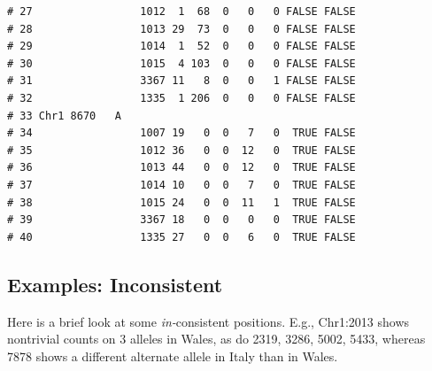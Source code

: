 \documentclass{article}\usepackage[]{graphicx}\usepackage[]{color}
\makeatletter
\newenvironment{kframe}{%
 \def\at@end@of@kframe{}%
 \ifinner\ifhmode%
  \def\at@end@of@kframe{\end{minipage}}%
  \begin{minipage}{\columnwidth}%
 \fi\fi%
 \def\FrameCommand##1{\hskip\@totalleftmargin \hskip-\fboxsep
 \colorbox{shadecolor}{##1}\hskip-\fboxsep
     \hskip-\linewidth \hskip-\@totalleftmargin \hskip\columnwidth}%
 \MakeFramed {\advance\hsize-\width
   \@totalleftmargin\z@ \linewidth\hsize
   \@setminipage}}%
 {\par\unskip\endMakeFramed%
 \at@end@of@kframe}
\newenvironment{knitrout}{}{} %
\makeatother
\begin{document}
\begin{knitrout}
\begin{kframe}
\begin{verbatim}
# 27                 1012  1  68  0   0   0 FALSE FALSE        
# 28                 1013 29  73  0   0   0 FALSE FALSE        
# 29                 1014  1  52  0   0   0 FALSE FALSE        
# 30                 1015  4 103  0   0   0 FALSE FALSE        
# 31                 3367 11   8  0   0   1 FALSE FALSE        
# 32                 1335  1 206  0   0   0 FALSE FALSE        
# 33 Chr1 8670   A                                             
# 34                 1007 19   0  0   7   0  TRUE FALSE        
# 35                 1012 36   0  0  12   0  TRUE FALSE        
# 36                 1013 44   0  0  12   0  TRUE FALSE        
# 37                 1014 10   0  0   7   0  TRUE FALSE        
# 38                 1015 24   0  0  11   1  TRUE FALSE        
# 39                 3367 18   0  0   0   0  TRUE FALSE        
# 40                 1335 27   0  0   6   0  TRUE FALSE
\end{verbatim}
\end{kframe}
\end{knitrout}

\subsection{Examples: Inconsistent}
Here is a brief look at some \emph{in-}consistent positions.  E.g., Chr1:2013 shows nontrivial counts on 3 alleles in Wales, as do 2319, 3286, 5002, 5433, whereas 7878 shows a different alternate allele in Italy than in Wales.
\end{document}
